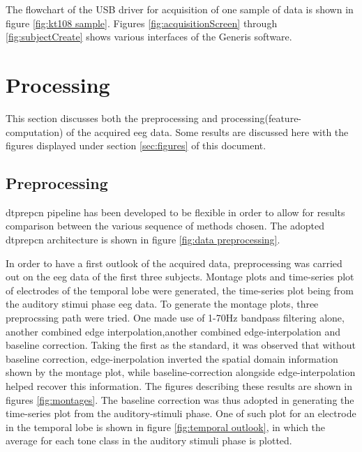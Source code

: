 \documentclass[10pt]{article}
\begin{document}
The flowchart of the USB driver for acquisition of one sample of data is shown in figure \ref{fig:kt108 sample}.
Figures \ref{fig:acquisitionScreen} through \ref{fig:subjectCreate} shows various interfaces of the Generis software.







\section{Processing}\label{sec:processing}
This section discusses both the preprocessing and processing(feature-computation) of the acquired \gls{eeg} data.
Some results are discussed here with the figures displayed under section \ref{sec:figures} of this document.

\subsection{Preprocessing}\label{ssec:ppcn}
\Gls{dtprepcn} pipeline has been developed to be flexible in order to allow for results comparison 
between the various sequence of methods chosen. The adopted \gls{dtprepcn}  architecture is shown 
in figure \ref{fig:data preprocessing}.

In order to have a first outlook of the acquired data, preprocessing was carried out on the \gls{eeg} data of 
the first three subjects. Montage plots and time-series plot of electrodes of 
the temporal lobe were generated, the time-series plot being from the auditory stimui phase 
\gls{eeg} data. To generate the montage plots, three preprocssing path were tried. One made use of 
1-70Hz bandpass filtering alone, another combined edge interpolation,another combined edge-interpolation 
and baseline correction. Taking the first as the standard, it was observed that without baseline correction, 
edge-inerpolation inverted the spatial domain information shown by the montage plot, while baseline-correction alongside 
edge-interpolation helped recover this information. The figures describing these results are shown in figures 
\ref{fig:montages}. The baseline correction was thus adopted in 
generating the time-series plot from the auditory-stimuli phase. One of such plot for an electrode in  the 
temporal lobe is shown in figure \ref{fig:temporal outlook}, in which the average for each tone class in the auditory 
stimuli phase is plotted. 
\end{document}
